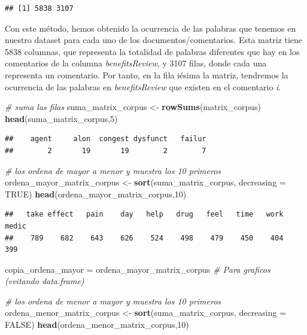 \documentclass[spanish,]{article}
\newenvironment{Shaded}{\begin{snugshade}}{\end{snugshade}}
\newcommand{\CommentTok}[1]{\textcolor[rgb]{0.56,0.35,0.01}{\textit{#1}}}
\newcommand{\DataTypeTok}[1]{\textcolor[rgb]{0.13,0.29,0.53}{#1}}
\newcommand{\DecValTok}[1]{\textcolor[rgb]{0.00,0.00,0.81}{#1}}
\newcommand{\KeywordTok}[1]{\textcolor[rgb]{0.13,0.29,0.53}{\textbf{#1}}}
\newcommand{\NormalTok}[1]{#1}
\newcommand{\OtherTok}[1]{\textcolor[rgb]{0.56,0.35,0.01}{#1}}
\newcommand{\StringTok}[1]{\textcolor[rgb]{0.31,0.60,0.02}{#1}}
\begin{document}
\begin{verbatim}
## [1] 5838 3107
\end{verbatim}

Con este método, hemos obtenido la ocurrencia de las palabras que
tenemos en nuestro dataset para cada uno de los documentos/comentarios.
Esta matriz tiene 5838 columnas, que representa la totalidad de palabras
diferentes que hay en los comentarios de la columna
\textit{benefitsReview}, y 3107 filas, donde cada una representa un
comentario. Por tanto, en la fila iésima la matriz, tendremos la
ocurrencia de las palabras en \textit{benefitsReview} que existen en el
comentario \textit{i}.

\begin{Shaded}
\begin{Highlighting}[]
\CommentTok{# suma las filas}
\NormalTok{suma_matrix_corpus <-}\StringTok{ }\KeywordTok{rowSums}\NormalTok{(matrix_corpus)}
\KeywordTok{head}\NormalTok{(suma_matrix_corpus,}\DecValTok{5}\NormalTok{)}
\end{Highlighting}
\end{Shaded}

\begin{verbatim}
##    agent     alon  congest dysfunct   failur 
##        2       19       19        2        7
\end{verbatim}

\begin{Shaded}
\begin{Highlighting}[]
\CommentTok{# los ordena de mayor a menor y muestra los 10 primeros}
\NormalTok{ordena_mayor_matrix_corpus <-}\StringTok{ }\KeywordTok{sort}\NormalTok{(suma_matrix_corpus, }\DataTypeTok{decreasing =} \OtherTok{TRUE}\NormalTok{)}
\KeywordTok{head}\NormalTok{(ordena_mayor_matrix_corpus,}\DecValTok{10}\NormalTok{)}
\end{Highlighting}
\end{Shaded}

\begin{verbatim}
##   take effect   pain    day   help   drug   feel   time   work  medic 
##    789    682    643    626    524    498    479    450    404    399
\end{verbatim}

\begin{Shaded}
\begin{Highlighting}[]
\NormalTok{copia_ordena_mayor =}\StringTok{ }\NormalTok{ordena_mayor_matrix_corpus }\CommentTok{# Para graficos (evitando data.frame)}

\CommentTok{# los ordena de menor a mayor y muestra los 10 primeros}
\NormalTok{ordena_menor_matrix_corpus <-}\StringTok{ }\KeywordTok{sort}\NormalTok{(suma_matrix_corpus, }\DataTypeTok{decreasing =} \OtherTok{FALSE}\NormalTok{)}
\KeywordTok{head}\NormalTok{(ordena_menor_matrix_corpus,}\DecValTok{10}\NormalTok{)}
\end{Highlighting}
\end{Shaded}
\end{document}
